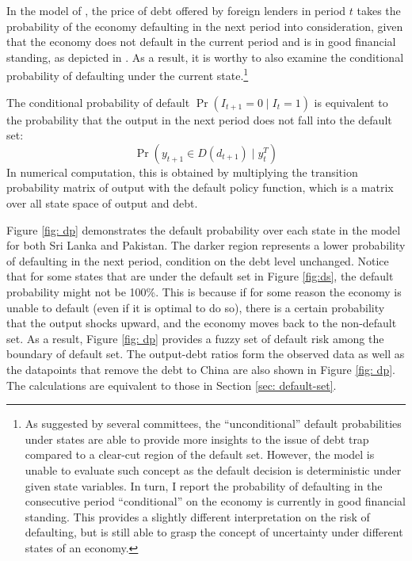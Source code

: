 In the model of \citet{Na-18}, the price of debt offered by foreign lenders in period $t$ takes the probability of the economy defaulting in the next period into consideration, given that the economy does not default in the current period and is in good financial standing, as depicted in .
As a result, it is worthy to also examine the conditional probability of defaulting under the current state.\footnote{%
    As suggested by several committees, the ``unconditional'' default probabilities under states are able to provide more insights to the issue of debt trap compared to a clear-cut region of the default set. However, the model is unable to evaluate such concept as the default decision is deterministic under given state variables. In turn, I report the probability of defaulting in the consecutive period ``conditional'' on the economy is currently in good financial standing. This provides a slightly different interpretation on the risk of defaulting, but is still able to grasp the concept of uncertainty under different states of an economy.
}

The conditional probability of default $\Pr (I_{t+1} = 0 \mid I_{t} = 1)$ is equivalent to the probability that the output in the next period does not fall into the default set:
\begin{equation*}
    \Pr (y_{t+1} \in D(d_{t+1}) \mid y^T_t)
\end{equation*}
In numerical computation, this is obtained by multiplying the transition probability matrix of output with the default policy function, which is a matrix over all state space of output and debt.

Figure \ref{fig: dp} demonstrates the default probability over each state in the model for both Sri Lanka and Pakistan. The darker region represents a lower probability of defaulting in the next period, condition on the debt level unchanged. Notice that for some states that are under the default set in Figure \ref{fig:ds}, the default probability might not be 100\%. This is because if for some reason the economy is unable to default (even if it is optimal to do so), there is a certain probability that the output shocks upward, and the economy moves back to the non-default set. As a result, Figure \ref{fig: dp} provides a fuzzy set of default risk among the boundary of default set.
The output-debt ratios form the observed data as well as the datapoints that remove the debt to China are also shown in Figure \ref{fig: dp}. The calculations are equivalent to those in Section \ref{sec: default-set}.

